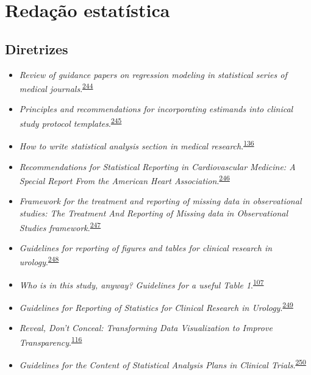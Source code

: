 \documentclass[
  a4paper,
]{book}
\begin{document}
\hypertarget{redacao}{%
\chapter{\texorpdfstring{\textbf{Redação estatística}}{Redação estatística}}\label{redacao}}

\hypertarget{diretrizes}{%
\section{Diretrizes}\label{diretrizes}}

\begin{itemize}
\item
  \emph{Review of guidance papers on regression modeling in statistical series of medical journals}.\textsuperscript{\protect\hyperlink{ref-Wallisch2022}{244}}
\item
  \emph{Principles and recommendations for incorporating estimands into clinical study protocol templates}.\textsuperscript{\protect\hyperlink{ref-Lynggaard2022}{245}}
\item
  \emph{How to write statistical analysis section in medical research}.\textsuperscript{\protect\hyperlink{ref-Dwivedi2022}{136}}
\item
  \emph{Recommendations for Statistical Reporting in Cardiovascular Medicine: A Special Report From the American Heart Association}.\textsuperscript{\protect\hyperlink{ref-Althouse2021}{246}}
\item
  \emph{Framework for the treatment and reporting of missing data in observational studies: The Treatment And Reporting of Missing data in Observational Studies framework}.\textsuperscript{\protect\hyperlink{ref-Lee2021}{247}}
\item
  \emph{Guidelines for reporting of figures and tables for clinical research in urology}.\textsuperscript{\protect\hyperlink{ref-Vickers2020}{248}}
\item
  \emph{Who is in this study, anyway? Guidelines for a useful Table 1}.\textsuperscript{\protect\hyperlink{ref-Hayes-Larson2019}{107}}
\item
  \emph{Guidelines for Reporting of Statistics for Clinical Research in Urology}.\textsuperscript{\protect\hyperlink{ref-assel2019}{249}}
\item
  \emph{Reveal, Don't Conceal: Transforming Data Visualization to Improve Transparency}.\textsuperscript{\protect\hyperlink{ref-Weissgerber2019}{116}}
\item
  \emph{Guidelines for the Content of Statistical Analysis Plans in Clinical Trials}.\textsuperscript{\protect\hyperlink{ref-Gamble2017}{250}}

\end{itemize}
\end{document}
